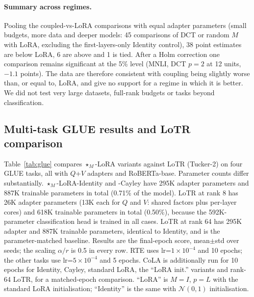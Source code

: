 \documentclass{article}
\theoremstyle{plain}
\begin{document}
\paragraph{Summary across regimes.}
Pooling the coupled-vs-LoRA comparisons with equal adapter parameters (small budgets, more data and deeper models: 45 comparisons of DCT or random $M$ with LoRA, excluding the first-layers-only Identity control),
38 point estimates are below LoRA, 6 are above and 1 is tied.
After a Holm correction one comparison remains significant at the 5\% level (MNLI, DCT $p=2$ at 12 units, $-1.1$ points).
The data are therefore consistent with coupling being slightly worse than, or equal to, LoRA, and give no support for a regime in which it is better.
We did not test very large datasets, full-rank budgets or tasks beyond classification.

\subsection{Multi-task GLUE results and LoTR comparison}
\label{sec:multitask}

Table~\ref{tab:glue} compares $\star_M$-LoRA variants against LoTR (Tucker-2) on
four GLUE tasks, all with $Q$+$V$ adapters and RoBERTa-base.
Parameter counts differ substantially.
$\star_M$-LoRA-Identity and -Cayley have 295K adapter parameters and 887K trainable parameters in total
(0.71\% of the model).
LoTR at rank 8 has 26K adapter parameters (13K each for $Q$ and $V$: shared factors plus
per-layer cores) and 618K trainable parameters in total (0.50\%), because the 592K-parameter
classification head is trained in all cases.
LoTR at rank 64 has 295K adapter and 887K trainable parameters, identical to Identity, and is the parameter-matched baseline.
Results are the final-epoch score, mean$\pm$std over seeds; the scaling $\alpha/r$ is 0.5 in every row.
RTE uses lr=$1\times10^{-4}$ and 10 epochs; the other tasks use lr=$5\times10^{-4}$ and 5 epochs.
CoLA is additionally run for 10 epochs for Identity, Cayley, standard LoRA, the ``LoRA init.'' variants and rank-64 LoTR, for a matched-epoch comparison.
``LoRA'' is $M=I$, $p=L$ with the standard LoRA initialisation; ``Identity'' is the same with $\mathcal{N}(0,1)$ initialisation.
\end{document}
